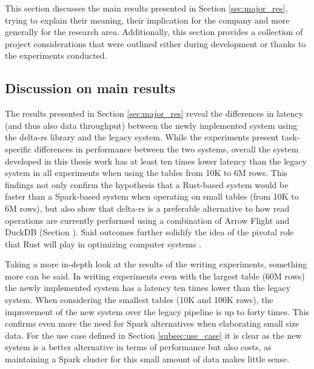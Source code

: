This section discusses the main results presented in Section \ref{sec:major_res}, trying to explain their meaning, their implication for the company and more generally for the research area. Additionally, this section provides a collection of project considerations that were outlined either during development or thanks to the experiments conducted.

\subsection{Discussion on main results}

The results presented in Section \ref{sec:major_res} reveal the differences in latency (and thus also data throughput) between the newly implemented system using the delta-rs library and the legacy system. While the experiments present task-specific differences in performance between the two systems, overall the system developed in this thesis work has at least ten times lower latency than the legacy system in all experiments when using the tables from 10K to 6M rows. This findings not only confirm the hypothesis that a Rust-based system would be faster than a Spark-based system when operating on small tables (from 10K to 6M rows), but also show that delta-rs is a preferable alternative to how read operations are currently performed using a combination of Arrow Flight and DuckDB (Section ). Said outcomes further solidify the idea of the pivotal role that Rust will play in optimizing computer systems \cite{Balasub2017}.

Taking a more in-depth look at the results of the writing experiments, something more can be said. In writing experiments even with the largest table (60M rows) the newly implemented system has a latency ten times lower than the legacy system. When considering the smallest tables (10K and 100K rows), the improvement of the new system over the legacy pipeline is up to forty times. This confirms even more the need for Spark alternatives when elaborating small size data. For the use case defined in Section \ref{subsec:use_case} it is clear as the new system is a better alternative in terms of performance but also costs, as maintaining a Spark cluster for this small amount of data makes little sense. 


